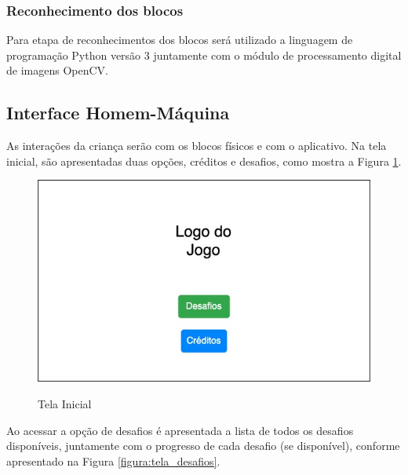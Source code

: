     \subsubsection{Reconhecimento dos blocos}
     
     Para etapa de reconhecimentos dos blocos será utilizado a linguagem de programação Python versão 3 juntamente com o módulo de processamento digital de imagens OpenCV.

    
    
    \subsection{Interface Homem-Máquina}
    As interações da criança serão com os blocos físicos e com o aplicativo.
    Na tela inicial, são apresentadas duas opções, créditos e desafios, como mostra a Figura \ref{figura:tela_inicial}.
    
    \begin{figure}[H]
        \caption{Tela Inicial}
        \centering
        \includegraphics[width=\linewidth]{Imagens/Cap3/Tela Inicial.jpg}
        \label{figura:tela_inicial}
    \end{figure}
    
    Ao acessar a opção de desafios é apresentada a lista de todos os desafios disponíveis, juntamente com o progresso de cada desafio (se disponível), conforme apresentado na Figura \ref{figura:tela_desafios}.
    
